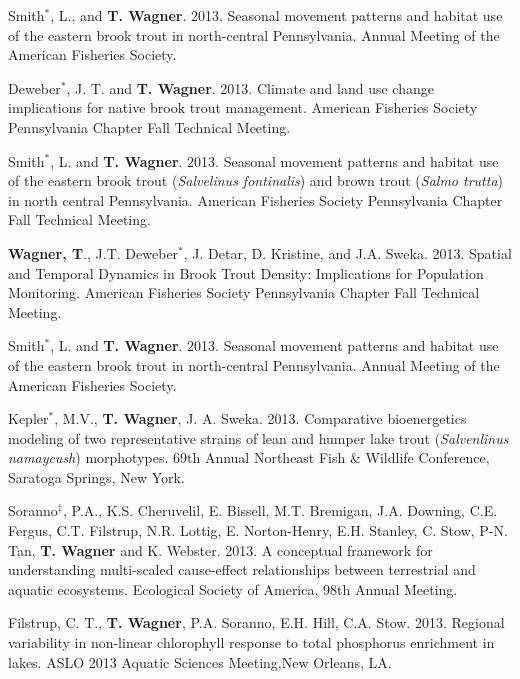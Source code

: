 \documentclass[10pt]{article}
\begin{document}
\begin{flushleft}
\begin{etaremune}
\item Smith$^*$, L., and {\bf T. Wagner}. 2013. Seasonal movement patterns and habitat use of the eastern brook trout in north-central Pennsylvania. Annual Meeting of the American Fisheries Society. 

\item Deweber$^*$, J. T. and {\bf T. Wagner}. 2013. Climate and land use change implications for native brook trout management. American Fisheries Society Pennsylvania Chapter Fall Technical Meeting.

\item Smith$^*$, L. and {\bf T. Wagner}. 2013. Seasonal movement patterns and habitat use of the eastern brook trout (\emph{Salvelinus fontinalis}) and brown trout (\emph{Salmo trutta}) in north central Pennsylvania. American Fisheries Society Pennsylvania Chapter Fall Technical Meeting. 

\item {\bf Wagner, T}., J.T. Deweber$^*$, J. Detar, D. Kristine, and J.A. Sweka. 2013. Spatial and Temporal Dynamics in Brook Trout Density: Implications for Population Monitoring. American Fisheries Society Pennsylvania Chapter Fall Technical Meeting.

\item Smith$^*$, L. and {\bf T. Wagner}. 2013. Seasonal movement patterns and habitat use of the eastern brook trout in north-central Pennsylvania. Annual Meeting of the American Fisheries Society.

\item Kepler$^*$, M.V.,  {\bf T. Wagner}, J. A. Sweka. 2013. Comparative bioenergetics modeling of two representative strains of lean and humper lake trout (\emph{Salvenlinus namaycush}) morphotypes. 69th Annual Northeast Fish \& Wildlife Conference, Saratoga Springs, New York. 

\item Soranno$^\ddagger$, P.A., K.S. Cheruvelil, E. Bissell, M.T. Bremigan, J.A. Downing, C.E. Fergus, C.T. Filstrup, N.R. Lottig, E. Norton-Henry, E.H. Stanley, C. Stow, P-N. Tan, {\bf T. Wagner} and K. Webster. 2013. A conceptual framework for understanding multi-scaled cause-effect relationships between terrestrial and aquatic ecosystems. Ecological Society of America, 98th Annual Meeting.

\item Filstrup, C. T., {\bf T. Wagner}, P.A. Soranno, E.H. Hill, C.A. Stow. 2013. Regional variability in non-linear chlorophyll response to total phosphorus enrichment in lakes. ASLO 2013 Aquatic Sciences Meeting,New Orleans, LA.


\end{etaremune}
\end{flushleft}
\end{document}
